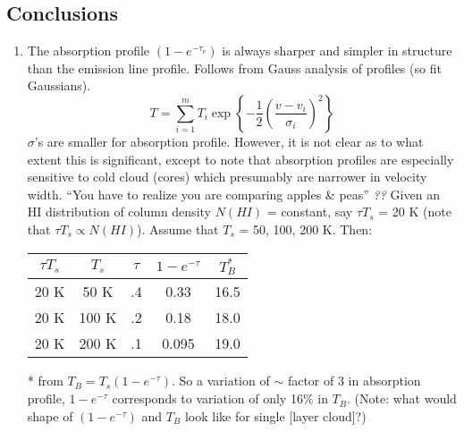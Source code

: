 \documentclass[12pt]{article}
\newcommand{\mar}[1]{\hspace{0pt}\marginpar{-\textcolor{black}{#1}-}}
\newcommand{\mynotes}[1]{{\fontfamily{cmss}\selectfont \textit{#1}}}
\begin{document}
\subsection{Conclusions}
\mar{45}
\begin{enumerate}
    \item The absorption profile $(1 - {e}^{-\tau_{\nu}})$ is always
        sharper and simpler in structure than the emission line profile.
        Follows from Gauss analysis of profiles (so fit Gaussians).
        \[
            T = \sum_{i=1}^{m}{
                T_{i} \exp \left\{ -\frac{1}{2} \left(
                    \frac{v - v_{i}}{\sigma_{i}} \right)^{2}
                \right\}}
            \]
        $\sigma$'s are smaller for absorption profile. However, it is not
        clear as to what extent this is significant, except to note that
        absorption profiles are especially sensitive to cold cloud (cores)
        which presumably are narrower in velocity width.
        ``You have to realize you are comparing apples \& peas'' \mynotes{??}
        Given an HI distribution of column density $N(HI)$ = constant, say
        $\tau T_{s}$ = 20 K (note that $\tau T_{s} \propto N(HI)$).
        Assume that $T_{s}$ = 50, 100, 200 K. Then:
        \begin{center}
            \begin{tabular}{c c c c c}
                $\tau T_{s}$ & $T_{s}$ & $\tau$ & $1-e^{-\tau}$ & $T_{B}^{*}$\\
                \hline
                20 K & 50 K & .4 & 0.33 & 16.5\\
                20 K & 100 K & .2 & 0.18 & 18.0\\
                20 K & 200 K & .1 & 0.095 & 19.0\\
            \end{tabular}
        \end{center}
        * from $T_{B} = T_{s} (1-e^{-\tau})$. So a variation of $\sim$
        factor of 3 in absorption profile, $1-e^{-\tau}$ corresponds to
        variation of only 16\% in $T_{B}$. (Note: what would shape of
        $(1-e^{-\tau})$ and $T_{B}$ look like for single [layer cloud]?)


\end{enumerate}
\end{document}
